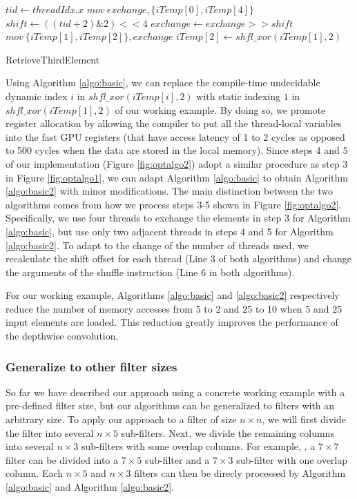 \begin{algorithm}[t!]
\small

	$tid \gets threadIdx.x$\;
	$mov\ exchange, \{iTemp[0], iTemp[4]\}$\;
	$shift \gets ((tid+2)\&2)<<4$\;
	$exchange \gets exchange >> shift$\;
	$mov\ \{iTemp[1],iTemp[2]\}, exchange$\;
	$iTemp[2] \gets shfl\_xor(iTemp[1],2)$\;	
	
	\caption{RetrieveThirdElement}
	\label{algo:basic}
	
\end{algorithm}

Using Algorithm \ref{algo:basic}, we can replace the compile-time undecidable dynamic index $i$ in $shfl\_xor(iTemp[i],2)$ with static
indexing $1$ in $shfl\_xor(iTemp[1],2)$ of our working example. By doing so, we promote register allocation by allowing the compiler to put
all the thread-local variables into the fast GPU registers (that have access latency of 1 to 2 cycles as opposed to 500 cycles when the
data are stored in the local memory). Since steps 4 and 5 of our implementation (Figure \ref{fig:optalgo2}) adopt a similar procedure as
step 3 in Figure \ref{fig:optalgo1}, we can adapt Algorithm \ref{algo:basic} to obtain Algorithm \ref{algo:basic2} with minor
modifications. The main distinction between the two algorithms comes from how we process steps 3-5 shown in Figure \ref{fig:optalgo2}.
Specifically, we use four threads to exchange the elements in step 3 for Algorithm \ref{algo:basic}, but use only two adjacent threads in
steps 4 and 5 for Algorithm \ref{algo:basic2}. To adapt to the change of the number of threads used, we recalculate the shift offset for
each thread (Line 3 of both algorithms) and change the arguments of the shuffle instruction (Line 6 in both algorithms).

For our working example, Algorithms \ref{algo:basic} and \ref{algo:basic2} respectively reduce the number of memory accesses from 5 to 2
and 25 to 10 when 5 and 25 input elements are loaded. This reduction greatly improves the performance of the depthwise convolution.

\subsubsection{Generalize to other filter sizes} So far we have described our approach using a concrete working example with a pre-defined
filter size, but our algorithms can be generalized to filters with an arbitrary size. To apply our approach to a filter of size $n \times
n$, we will first divide the filter into several $n \times 5$ sub-filters. Next, we divide the remaining columns into several $n \times 3$
sub-filters with some overlap columns. For example, , a $7 \times 7$ filter can be divided into
a $7 \times 5$ sub-filter and a $7 \times 3$ sub-filter with one overlap column. Each $n \times 5$ and $n \times 3$ filters can then be
direcly processed by Algorithm \ref{algo:basic} and Algorithm \ref{algo:basic2}.


